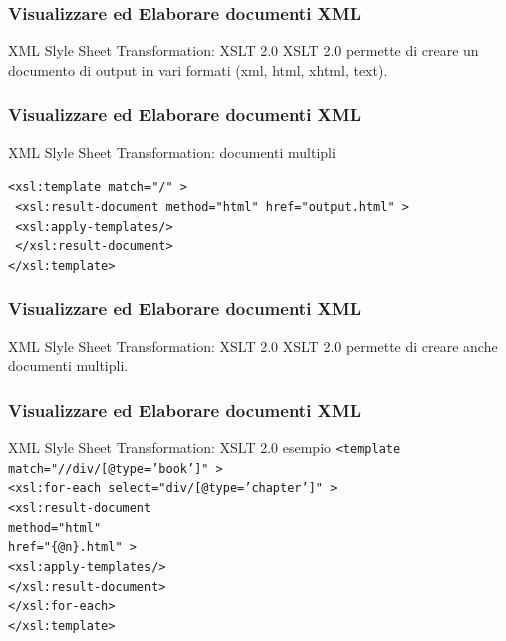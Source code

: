 \begin{frame}
    \frametitle{Visualizzare ed Elaborare documenti XML}
    \addtocounter{nframe}{1}
    

     \begin{block}{XML Slyle Sheet Transformation: XSLT 2.0}
        XSLT 2.0 permette di creare un documento di output in vari formati (xml, html, xhtml, text).
     \end{block}

\end{frame}

\begin{frame}
    \frametitle{Visualizzare ed Elaborare documenti XML}
    \addtocounter{nframe}{1}
    

     \begin{block}{XML Slyle Sheet Transformation: documenti multipli}
       
        \texttt{<xsl:template match="/" >}
        \\\texttt{ <xsl:result-document method="html" href="output.html" >}
        \\\texttt{ <xsl:apply-templates/>}
        \\\texttt{ </xsl:result-document>}
        \\\texttt{</xsl:template>}
            
     \end{block}

\end{frame}

\begin{frame}
    \frametitle{Visualizzare ed Elaborare documenti XML}
    \addtocounter{nframe}{1}

     \begin{block}{XML Slyle Sheet Transformation: XSLT 2.0}
        XSLT 2.0 permette di creare anche documenti multipli.
     \end{block}

\end{frame}

\begin{frame}
    \frametitle{Visualizzare ed Elaborare documenti XML}
    \addtocounter{nframe}{1}

     \begin{block}{XML Slyle Sheet Transformation: XSLT 2.0 esempio}
        \texttt{<template match="//div/[@type='book']" >}
        \\\texttt{<xsl:for-each select="div/[@type='chapter']" >}
        \\\texttt{<xsl:result-document}
           \\\texttt{method="html"}
           \\\texttt{href="\{@n\}.html" >}
           \\\texttt{<xsl:apply-templates/>}
        \\\texttt{</xsl:result-document>}
        \\\texttt{</xsl:for-each>}
        \\\texttt{</xsl:template>}
    
    \end{block}

\end{frame}

